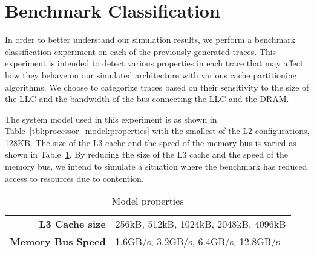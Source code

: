 \section{Benchmark Classification}



In order to better understand our simulation results, we perform a benchmark classification experiment on each of the previously generated traces.
This experiment is intended to detect various properties in each trace that may affect how they behave on our simulated architecture with various cache partitioning algorithms.
We choose to categorize traces based on their sensitivity to the size of the LLC and the bandwidth of the bus connecting the LLC and the DRAM.

The system model used in this experiment is as shown in Table~\ref{tbl:processor_model:properties} with the smallest of the L2 configurations, 128KB.
The size of the L3 cache and the speed of the memory bus is varied as shown in Table~\ref{tbl:benchmarks_workloads:classification_model}.
By reducing the size of the L3 cache and the speed of the memory bus, we intend to simulate a situation where the benchmark has reduced access to resources due to contention.

\begin{table}[ht]
\centering
\begin{tabular}{rl}
\toprule
\bf{L3 Cache size} & 256kB, 512kB, 1024kB, 2048kB, 4096kB \\
\bf{Memory Bus Speed}   & 1.6GB/s, 3.2GB/s, 6.4GB/s, 12.8GB/s \\
\bottomrule                             
\end{tabular}
\caption{Model properties}
\label{tbl:benchmarks_workloads:classification_model}
\end{table}

